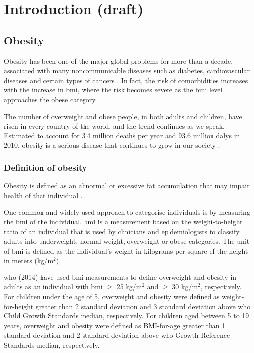 \chapter{Introduction (draft)}
\label{ch:intro}

\section{Obesity}
\label{sec:obesity}

Obesity has been one of the major global problems for more than a decade, associated with many noncommunicable diseases such as diabetes, cardiovascular diseases and certain types of cancers \citep{WHO2014}.
In fact, the risk of comorbidities increases with the increase in \gls{bmi}, where the risk becomes severe as the \gls{bmi} level approaches the obese category \citep{WHO2000}.

The number of overweight and obese people, in both adults and children, have risen in every country of the world, and the trend continues as we speak.
Estimated to account for 3.4 million deaths per year and 93.6 million \glspl{daly} in 2010, obesity is a serious disease that continues to grow in our society \citep{Lim2012}.

\subsection{Definition of obesity}
\label{sub:definition_of_obesity}

Obesity is defined as an abnormal or excessive fat accumulation that may impair health of that individual \citep{Garrow1988}.

One common and widely used approach to categorise individuals is by measuring the \gls{bmi} of the individual.
\gls{bmi} is a measurement based on the weight-to-height ratio of an individual that is used by clinicians and epidemiologists to classify adults into underweight, normal weight, overweight or obese categories.
The unit of \gls{bmi} is defined as the individual's weight in kilograms per square of the height in meters (kg/m$^2$).

\gls{who} (2014) have used \gls{bmi} measurements to define overweight and obesity in adults as an individual with \gls{bmi} $\geq$ 25 kg/m$^2$ and $\geq$ 30 kg/m$^2$, respectively.
For children under the age of 5, overweight and obesity were defined as weight-for-height greater than 2 standard deviation and 3 standard deviation above \gls{who} Child Growth Standards median, respectively.
For children aged between 5 to 19 years, overweight and obesity were defined as BMI-for-age greater than 1 standard deviation and 2 standard deviation above \gls{who} Growth Reference Standards median, respectively.

